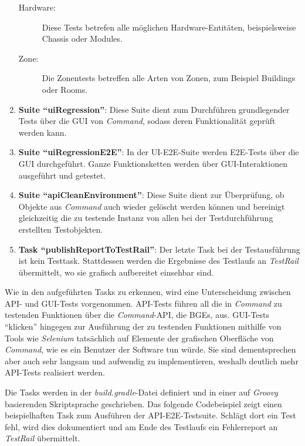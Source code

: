 \begin{enumerate}
\begin{description}
        \item[Hardware:] Diese Tests betrefen alle möglichen Hardware-Entitäten, beispielsweise Chassis oder Modules.
        \item[Zone:] Die Zonentests betreffen alle Arten von Zonen, zum Beispiel Buildings oder Rooms.
    \end{description}
    \item \textbf{Suite \enquote{uiRegression}}: Diese Suite dient zum Durchführen grundlegender Tests über die \ac{GUI} von \textit{Command}, sodass deren Funktionalität geprüft werden kann.
    \item \textbf{Suite \enquote{uiRegressionE2E}}: In der UI-\ac{E2E}-Suite werden \ac{E2E}-Tests über die \ac{GUI} durchgeführt. Ganze Funktionsketten werden über \ac{GUI}-Interaktionen ausgeführt und getestet.
    \item \textbf{Suite \enquote{apiCleanEnvironment}}: Diese Suite dient zur Überprüfung, ob Objekte aus \textit{Command} auch wieder gelöscht werden können und bereinigt gleichzeitig die zu testende Instanz von allen bei der Testdurchführung erstellten Testobjekten.
    \item \textbf{Task \enquote{publishReportToTestRail}}: Der letzte Task bei der Testausführung ist kein Testtask. Stattdessen werden die Ergebnisse des Testlaufs an \textit{TestRail} übermittelt, wo sie grafisch aufbereitet einsehbar sind.
\end{enumerate}

Wie in den aufgeführten Tasks zu erkennen, wird eine Unterscheidung zwischen \ac{API}- und \ac{GUI}-Tests vorgenommen. \ac{API}-Tests führen all die in \textit{Command} zu testenden Funktionen über die \textit{Command}-\ac{API}, die \ac{BGE}s, aus. \ac{GUI}-Tests \enquote{klicken} hingegen zur Ausführung der zu testenden Funktionen mithilfe von Tools wie \textit{Selenium} tatsächlich auf Elemente der grafischen Oberfläche von \textit{Command}, wie es ein Benutzer der Software tun würde. Sie sind dementsprechen aber auch sehr langsam und aufwendig zu implementieren, weshalb deutlich mehr \ac{API}-Tests realisiert werden.

Die Tasks werden in der \textit{build.gradle}-Datei definiert und in einer auf \textit{Groovy} basierenden Skriptsprache geschrieben. Das folgende Codebeispiel zeigt einen beispielhaften Task zum Ausführen der \ac{API}-\ac{E2E}-Testsuite. Schlägt dort ein Test fehl, wird dies dokumentiert und am Ende des Testlaufs ein Fehlerreport an \textit{TestRail} übermittelt.

